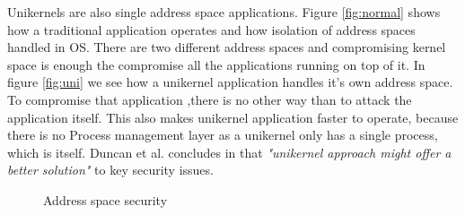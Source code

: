 Unikernels are also single address space applications. Figure \ref{fig:normal} shows how a traditional application operates and how isolation of address spaces handled in OS. There are two different address spaces and compromising kernel space is enough the compromise all the applications running on top of it. In figure \ref{fig:uni} we see how a unikernel application handles it's own address space. To compromise that application ,there is no other way than to attack the application itself. This also makes unikernel application faster to operate, because there is no Process management layer as a unikernel only has a single process, which is itself. Duncan et al. concludes in \cite{Duncan2017} that \textit{"unikernel approach might offer a better solution"} to key security issues.
\begin{figure}[htbp]
    \centering
    \hfill
    \caption{Address space security}\label{fig:single-space}
  \end{figure}


